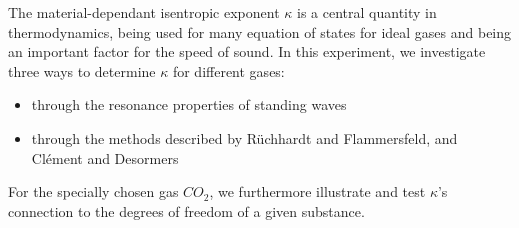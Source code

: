 \documentclass[../main.tex]{subfiles}
\begin{document}
The material-dependant isentropic exponent $\kappa$ is a central quantity in thermodynamics, being used for many equation of states for ideal gases and being an important factor for the speed of sound. In this experiment, we investigate three ways to determine $\kappa$ for different gases:
\begin{itemize}
    \item through the resonance properties of standing waves 
    \item through the methods described by Rüchhardt and Flammersfeld, and Clément and Desormers
\end{itemize}

For the specially chosen gas $CO_2$, we furthermore illustrate and test $\kappa$'s connection to the degrees of freedom of a given substance.
\end{document}
